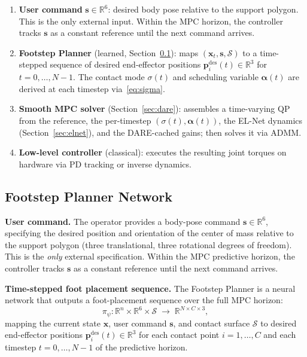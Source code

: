 \documentclass[letterpaper, 10pt, conference]{IEEEtran}
\newcommand{\R}{\mathbb{R}}
\newcommand{\balpha}{\bm{\alpha}}
\newcommand{\bx}{\bm{x}}
\newcommand{\bp}{\bm{p}}
\newcommand{\cS}{\mathcal{S}}
\begin{document}
\begin{enumerate}
  \item \textbf{User command} $\bm{s} \in \R^6$:
    desired body pose relative to the support polygon.
    This is the only external input.
    Within the MPC horizon, the controller tracks $\bm{s}$
    as a constant reference until the next command arrives.
  \item \textbf{Footstep Planner} (learned, Section~\ref{sec:footstep}):
    maps $(\bx_t, \bm{s}, \cS)$ to a time-stepped sequence
    of desired end-effector positions
    $\bp_i^{\mathrm{des}}(t) \in \R^3$
    for $t = 0, \ldots, N{-}1$.
    The contact mode $\sigma(t)$ and scheduling variable
    $\balpha(t)$ are derived at each timestep
    via~\eqref{eq:sigma}.
  \item \textbf{Smooth MPC solver} (Section~\ref{sec:dare}):
    assembles a time-varying QP from the reference,
    the per-timestep $(\sigma(t), \balpha(t))$,
    the EL-Net dynamics (Section~\ref{sec:elnet}),
    and the DARE-cached gains; then solves it via ADMM.
  \item \textbf{Low-level controller} (classical):
    executes the resulting joint torques on hardware
    via PD tracking or inverse dynamics.
\end{enumerate}

\subsection{Footstep Planner Network}\label{sec:footstep}

\textbf{User command.}
The operator provides a body-pose command
$\bm{s} \in \R^6$, specifying the desired position and
orientation of the center of mass relative to the
support polygon (three translational, three rotational
degrees of freedom).
This is the \emph{only} external specification.
Within the MPC predictive horizon, the controller tracks
$\bm{s}$ as a constant reference until the next command arrives.

\textbf{Time-stepped foot placement sequence.}
The Footstep Planner is a neural network that outputs
a foot-placement sequence over the full MPC horizon:
\begin{equation}\label{eq:planner}
  \pi_\psi : \R^n \times \R^6 \times \cS
  \;\to\; \R^{N \times C \times 3},
\end{equation}
mapping the current state $\bx$, user command $\bm{s}$,
and contact surface $\cS$ to desired end-effector positions
$\bp_i^{\mathrm{des}}(t) \in \R^3$
for each contact point $i = 1, \ldots, C$ and each
timestep $t = 0, \ldots, N{-}1$ of the predictive horizon.
\end{document}
